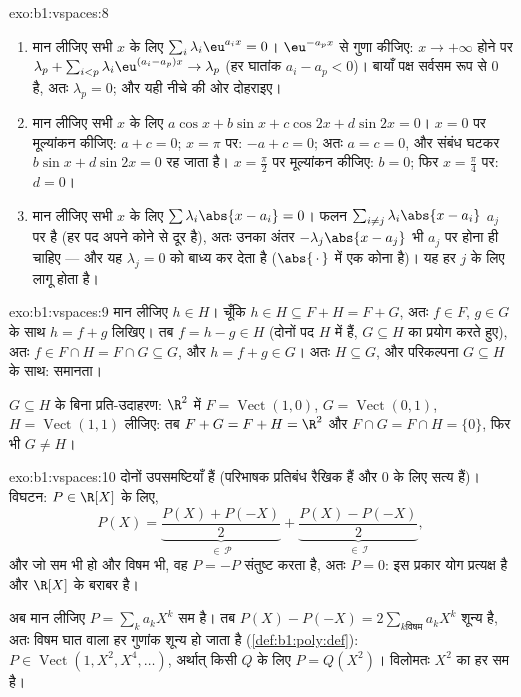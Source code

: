 \begin{solution}{exo:b1:vspaces:8}
\begin{enumerate}
  \item मान लीजिए सभी $x$ के लिए $\sum_{i} \lambda_i \eu^{a_i x} = 0$।
  $\eu^{-a_p x}$ से गुणा कीजिए: $x \to +\infty$ होने पर $\lambda_p + \sum_{i
  < p} \lambda_i \eu^{(a_i - a_p)x} \to \lambda_p$ (हर घातांक $a_i - a_p <
  0$)। बायाँ पक्ष सर्वसम रूप से $0$ है, अतः $\lambda_p = 0$; और यही नीचे की
  ओर दोहराइए।
  \item मान लीजिए सभी $x$ के लिए $a\cos x + b \sin x + c \cos 2x + d\sin 2x
  = 0$। $x = 0$ पर मूल्यांकन कीजिए: $a + c = 0$; $x = \pi$ पर: $-a + c = 0$;
  अतः $a = c = 0$, और संबंध घटकर $b\sin x + d \sin 2x = 0$ रह जाता है। $x =
  \frac\pi2$ पर मूल्यांकन कीजिए: $b = 0$; फिर $x = \frac\pi4$ पर: $d = 0$।
  \item मान लीजिए सभी $x$ के लिए $\sum \lambda_i \abs{x - a_i} = 0$। फलन
  $\sum_{i \neq j} \lambda_i\abs{x - a_i}$ $a_j$ पर  है (हर पद अपने
  कोने से दूर  है), अतः उनका अंतर $-\lambda_j \abs{x - a_j}$ भी $a_j$
  पर  होना ही चाहिए --- और यह $\lambda_j = 0$ को बाध्य कर देता है
  ($\abs{\,\cdot\,}$ में एक कोना है)। यह हर $j$ के लिए लागू होता है।
\end{enumerate}
\end{solution}

\begin{solution}{exo:b1:vspaces:9}
मान लीजिए $h \in H$। चूँकि $h \in H \subseteq F + H = F + G$, अतः $f \in F$,
$g \in G$ के साथ $h = f + g$ लिखिए। तब $f = h - g \in H$ (दोनों पद $H$ में
हैं, $G \subseteq H$ का प्रयोग करते हुए), अतः $f \in F \cap H = F \cap G
\subseteq G$, और $h = f + g \in G$। अतः $H \subseteq G$, और परिकल्पना $G
\subseteq H$ के साथ: समानता।

$G \subseteq H$ के बिना प्रति-उदाहरण: $\R^2$ में $F =
\operatorname{Vect}(1,0)$, $G = \operatorname{Vect}(0,1)$, $H =
\operatorname{Vect}(1,1)$ लीजिए: तब $F + G = F + H = \R^2$ और $F \cap G = F
\cap H = \{0\}$, फिर भी $G \neq H$।
\end{solution}

\begin{solution}{exo:b1:vspaces:10}
दोनों  उपसमष्टियाँ हैं (परिभाषक प्रतिबंध रैखिक हैं और $0$ के लिए सत्य
हैं)। विघटन: $P \in \R[X]$ के लिए,
\[
P(X) = \underbrace{\frac{P(X) + P(-X)}{2}}_{\in\,\mathcal P}
+ \underbrace{\frac{P(X) - P(-X)}{2}}_{\in\,\mathcal I},
\]
और जो  सम भी हो और विषम भी, वह $P = -P$ संतुष्ट करता है, अतः $P = 0$:
इस प्रकार योग प्रत्यक्ष है और $\R[X]$ के बराबर है।

अब मान लीजिए $P = \sum_k a_k X^k$ सम है। तब $P(X) - P(-X) = 2 \sum_{k \text{
विषम}} a_k X^k$ शून्य  है, अतः विषम घात वाला हर गुणांक शून्य हो जाता है
(\cref{def:b1:poly:def}): $P \in \operatorname{Vect}(1, X^2, X^4, \dots)$,
अर्थात् किसी  $Q$ के लिए $P = Q(X^2)$। विलोमतः $X^2$ का हर  सम है।
\end{solution}

